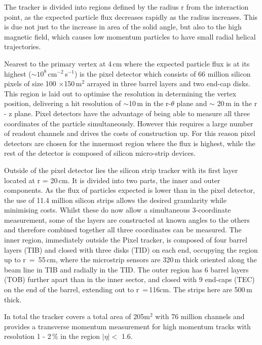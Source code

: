 The tracker is divided into regions defined by the radius r from the interaction point, as the expected particle flux decreases rapidly as the radius increases. This is due not just to the increase in area of the solid angle, but also to the high magnetic field, which causes low momentum particles to have small radial helical trajectories.

Nearest to the primary vertex at 4\,cm where the expected particle flux is at its highest ($\sim10^{8}$\,cm$^{-2}$\,s$^{-1}$) is the pixel detector which consists of 66 million silicon pixels of size 100 $\times$150\,\textmu m$^{2}$ arrayed in three barrel layers and two end-cap disks. This region is laid out to optimise the resolution in determining the vertex position, delivering a hit resolution of $\sim$10\,\textmu m in the r-$\theta$ plane and $\sim$ 20\,\textmu m in the r - z plane. Pixel detectors have the advantage of being able to measure all three coordinates of the particle simultaneously. However this requires a large number of readout channels and drives the costs of construction up. For this reason pixel detectors are chosen for the innermost region where the flux is highest, while the rest of the detector is composed of silicon micro-strip devices. 

Outside of the pixel detector lies the silicon strip tracker with its first layer located at r = 20\,cm. It is divided into two parts, the inner and outer components. As the flux of particles expected is lower than in the pixel detector, the use of 11.4 million silicon strips allows the desired granularity while minimising costs. Whilst these do now allow a simultaneous 3-coordinate measurement, some of the layers are constructed at known angles to the others and therefore combined together all three coordinates can be measured. The inner region, immediately outside the Pixel tracker, is composed of four barrel layers (TIB) and closed with three disks (TID) on each end, occupying the region up to r~=~55\,cm, where the microstrip sensors are 320\,\textmu m thick oriented along the beam line in TIB and radially in the TID. The outer region has 6 barrel layers (TOB) further apart than in the inner sector, and closed with 9 end-caps (TEC) on the end of the barrel, extending out to r~=\,116cm. The strips here are 500\,\textmu m thick.

In total the tracker covers a total area of 205m$^{2}$ with 76 million channels and provides a transverse momentum measurement for high momentum tracks with resolution 1 - 2\,\% in the region $|\eta| <$ 1.6.



